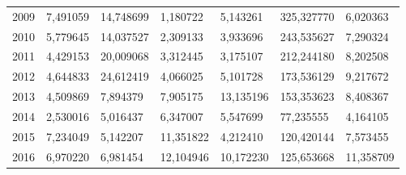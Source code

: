 \begin{table}
\begin{tabular}{p{1cm}p{2cm}p{2cm}p{2cm}p{2cm}p{2cm}p{2cm}}
 2009 &                                    7,491059 &            14,748699 &     1,180722 &                   5,143261 &                            325,327770 &                            6,020363 \\
 2010 &                                    5,779645 &            14,037527 &     2,309133 &                   3,933696 &                            243,535627 &                            7,290324 \\
 2011 &                                    4,429153 &            20,009068 &     3,312445 &                   3,175107 &                            212,244180 &                            8,202508 \\
 2012 &                                    4,644833 &            24,612419 &     4,066025 &                   5,101728 &                            173,536129 &                            9,217672 \\
 2013 &                                    4,509869 &             7,894379 &     7,905175 &                  13,135196 &                            153,353623 &                            8,408367 \\
 2014 &                                    2,530016 &             5,016437 &     6,347007 &                   5,547699 &                             77,235555 &                            4,164105 \\
 2015 &                                    7,234049 &             5,142207 &    11,351822 &                   4,212410 &                            120,420144 &                            7,573455 \\
 2016 &                                    6,970220 &             6,981454 &    12,104946 &                  10,172230 &                            125,653668 &                           11,358709 \\
\bottomrule
\end{tabular}
\end{table}
